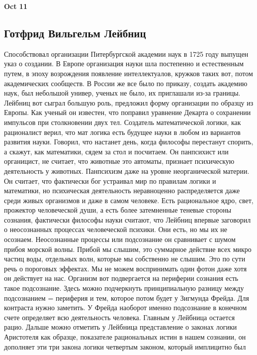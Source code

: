 \documentclass[a4paper, 12pt]{article}
\begin{document}
\hfill\textbf{Oct 11}

\subsection{Готфрид Вильгельм Лейбниц}

Способствовал организации Питербургской академии наук в 1725 году 
выпущен указ о создании. В Европе организация науки шла постепенно 
и естественным путем, в эпоху возрождения появление интеллектуалов, 
кружков таких вот, потом академических сообществ. В России же все было 
по приказу, создать академию наук, был небольшой универ, ученых не было, 
их приглашали из-за границы. Лейбниц вот сыграл большую роль, предложил 
форму организации по образцу из Европы. Как ученый он известен, что 
поправил уравнение Декарта о сохранении импульсов при столкновении двух 
тел. Создатель математической логики, как рационалист верил, что мат 
логика есть будущее науки в любом из вариантов развития науки. Говорил, 
что настанет день, когда философы перестанут спорить, а скажут, как 
математики, сядем за стол и посчитаем. Он панпсихист или органицист, не 
считает, что животные это автоматы, признает психическую деятельность 
у животных. Панпсихизм даже на уровне неорганической материи. Он 
считает, что фактически бог устраивал мир по правилам логики 
и математики, но психическая деятельность неравноценно распределяется 
даже среди живых организмов и даже в самом человеке. Есть рациональное 
ядро, свет, прожектор человеческой души, а есть более затемненные 
теневые стороны сознания, фактически философы науки считают, что Лейбниц 
впервые заговорил о неосознанных процессах человеческой психики. Они 
есть, но мы их не осознаем. Неосознанные процессы или подсознание он 
сравнивает с шумом прибоя морской волны. Прибой мы слышим, это суммарное 
действие всех микро частиц воды, отдельных волн, которые мы собственно 
не слышим. Это по сути речь о пороговых эффектах. Мы не можем 
воспринимать один фотон даже хотя он действует на нас. Организм вот 
подвергается на периферии сознания есть такое подсознание. Здесь можно 
подчеркнуть принципиальную разницу между подсознанием = периферия и тем, 
которое потом будет у Зигмунда Фрейда. Для контраста нужно заметить. 
У Фрейда наоборот именно подсознание в конечном счете определяет всю 
деятельность человека. Главным у Лейбница остается рацио. Дальше можно 
отметить у Лейбница представление о законах логики Аристотеля как 
образце, показателе рациональных истин в нашем сознании, он дополняет 
эти три закона логики четвертым законом, который имплицитно был 
\end{document}
